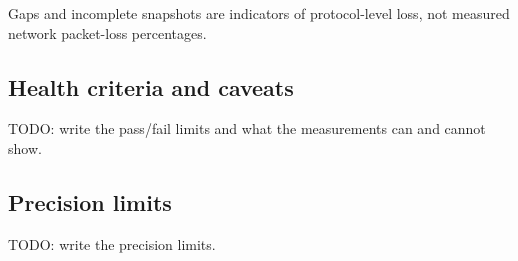 \documentclass[11pt]{article}
\begin{document}
Gaps and incomplete snapshots are indicators of protocol-level loss, not
measured network packet-loss percentages.


\subsection{Health criteria and caveats}
TODO: write the pass/fail limits and what the measurements can and cannot show.

\subsection{Precision limits}
\label{sec:precision}
TODO: write the precision limits.
\end{document}
